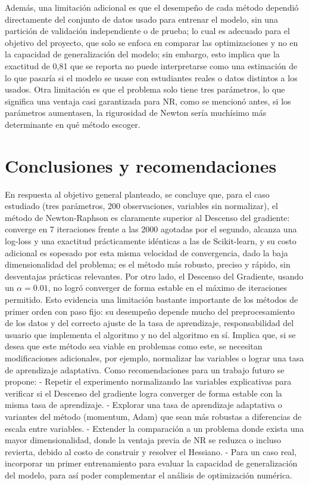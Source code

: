 Además, una limitación adicional es que el desempeño de cada método dependió directamente del conjunto de datos usado para entrenar el modelo, sin una partición de validación independiente o de prueba; lo cual es adecuado para el objetivo del proyecto, que solo se enfoca en comparar las optimizaciones y no en la capacidad de generalización del modelo; sin embargo, esto implica que la exactitud de 0,81 que se reporta no puede interpretarse como una estimación de lo que pasaría si el modelo se usase con estudiantes reales o datos distintos a los usados. Otra limitación es que el problema solo tiene tres parámetros, lo que significa una ventaja casi garantizada para NR, como se mencionó antes, si los parámetros aumentasen, la rigurosidad de Newton sería muchísimo más determinante en qué método escoger.

\section{Conclusiones y recomendaciones}

En respuesta al objetivo general planteado, se concluye que, para el caso estudiado (tres parámetros, 200 observaciones, variables sin normalizar), el método de Newton-Raphson es claramente superior al Descenso del gradiente: converge en 7 iteraciones frente a las 2000 agotadas por el segundo, alcanza una log-loss y una exactitud prácticamente idénticas a las de Scikit-learn, y su costo adicional es sopesado por esta misma velocidad de convergencia, dado la baja dimensionalidad del problema; es el método más robusto, preciso y rápido, sin desventajas prácticas relevantes. Por otro lado, el Descenso del Gradiente, usando un $\alpha = 0.01$, no logró converger de forma estable en el máximo de iteraciones permitido. Esto evidencia una limitación bastante importante de los métodos de primer orden con paso fijo: su desempeño depende mucho del preprocesamiento de los datos y del correcto ajuste de la tasa de aprendizaje, responsabilidad del usuario que implementa el algoritmo y no del algoritmo en sí. Implica que, si se desea que este método sea viable en problemas como este, se necesitan modificaciones adicionales, por ejemplo, normalizar las variables o lograr una tasa de aprendizaje adaptativa. Como recomendaciones para un trabajo futuro se propone: 
- Repetir el experimento normalizando las variables explicativas para verificar si el Descenso del gradiente logra converger de forma estable con la misma tasa de aprendizaje. 
- Explorar una tasa de aprendizaje adaptativa o variantes del método (momentum, Adam) que sean más robustas a diferencias de escala entre variables. 
- Extender la comparación a un problema donde exista una mayor dimensionalidad, donde la ventaja previa de NR se reduzca o incluso revierta, debido al costo de construir y resolver el Hessiano. 
- Para un caso real, incorporar un primer entrenamiento para evaluar la capacidad de generalización del modelo, para así poder complementar el análisis de optimización numérica.

